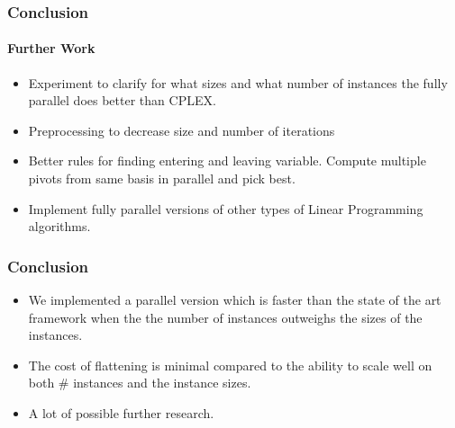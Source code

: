 \documentclass{beamer}
\begin{document}

\begin{frame}
\frametitle{Conclusion}
\framesubtitle{Further Work}
\begin{itemize}
	\item Experiment to clarify for what sizes and what number of instances the fully parallel does better than CPLEX.
	\item Preprocessing to decrease size and number of iterations
	\item Better rules for finding entering and leaving variable. Compute multiple pivots from same basis in parallel and pick best.
	\item Implement fully parallel versions of other types of Linear Programming algorithms.
\end{itemize}
\end{frame}

\begin{frame}
\frametitle{Conclusion}
\begin{itemize}
	\item We implemented a parallel version which is faster than the state of the art framework when the the number of instances outweighs the sizes of the instances.
	\item The cost of flattening is minimal compared to the ability to scale well on both \# instances and the instance sizes.
	\item A lot of possible further research.
\end{itemize}
\end{frame}
\end{document}
